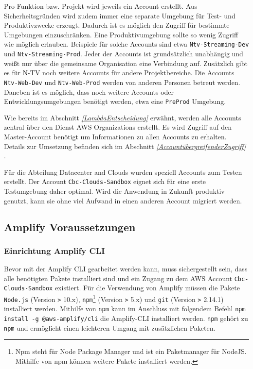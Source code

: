 Pro Funktion bzw. Projekt wird jeweils ein Account erstellt.
Aus Sicherheitsgründen wird zudem immer eine separate Umgebung für Test- und Produktivzwecke erzeugt.
Dadurch ist es möglich den Zugriff für bestimmte Umgebungen einzuschränken.
Eine Produktivumgebung sollte so wenig Zugriff wie möglich erlauben.
Beispiele für solche Accounts sind etwa \verb+Ntv-Streaming-Dev+ und \verb+Ntv-Streaming-Prod+.
Jeder der Accounts ist grundsätzlich unabhängig und weißt nur über die gemeinsame Organisation eine Verbindung auf.
Zusätzlich gibt es für N-TV noch weitere Accounts für andere Projektbereiche.
Die Accounts \verb+Ntv-Web-Dev+ und \verb+Ntv-Web-Prod+ werden von anderen Personen betreut werden.
Daneben ist es möglich, dass noch weitere Accounts oder Entwicklungsumgebungen benötigt werden, etwa eine \verb+PreProd+ Umgebung.

Wie bereits im Abschnitt \textit{\ref{LambdaEntscheidung} } erwähnt, werden alle Accounts zentral über den Dienst AWS Organizations erstellt.
Es wird Zugriff auf den Master-Account benötigt um Informationen zu allen Accounts zu erhalten.
Details zur Umsetzung befinden sich im Abschnitt \textit{\ref{AccountübergreifenderZugriff} }.

Für die Abteilung Datacenter and Clouds wurden speziell Accounts zum Testen erstellt.
Der Account \verb+Cbc-Clouds-Sandbox+ eignet sich für eine erste Testumgebung daher optimal.
Wird die Anwendung in Zukunft produktiv genutzt, kann sie ohne viel Aufwand in einen anderen Account migriert werden.


\subsection{Amplify Voraussetzungen}

\subsubsection{Einrichtung Amplify CLI}
\label{EinrichtungAmplify}
Bevor mit der Amplify CLI gearbeitet werden kann, muss sichergestellt sein, dass alle benötigten Pakete installiert sind und ein Zugang zu dem AWS Account \verb+Cbc-Clouds-Sandbox+ existiert.
Für die Verwendung von Amplify müssen die Pakete \verb+Node.js+ (Version \verb+>+ 10.x), \verb+npm+\footnote{Npm steht für Node Package Manager und ist ein Paketmanager für NodeJS. Mithilfe von npm können weitere Pakete installiert werden.} (Version \verb+>+ 5.x) und \verb+git+ (Version \verb+>+ 2.14.1) installiert werden.
Mithilfe von \verb+npm+ kann im Anschluss mit folgendem Befehl \verb+npm install -g @aws-amplify/cli+ die Amplify-CLI installiert werden.
\verb+npm+ gehört zu \verb+npm+ und ermöglicht einen leichteren Umgang mit zusätzlichen Paketen.

